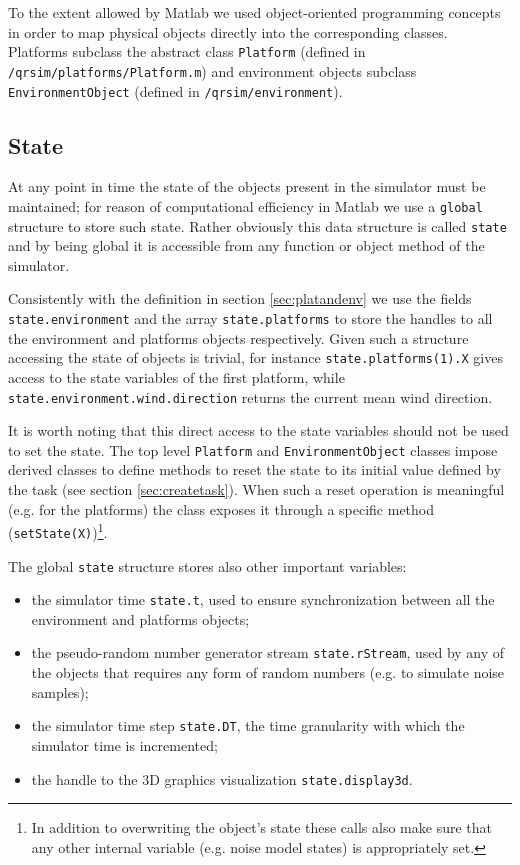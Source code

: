 \documentclass[a4paper,11pt]{report}
\begin{document}
To the extent allowed by Matlab we used object-oriented programming concepts in order to map physical objects directly into the corresponding classes. Platforms subclass the abstract class \texttt{Platform} (defined in \texttt{/qrsim/platforms/Platform.m}) and environment objects subclass \texttt{EnvironmentObject} (defined in \texttt{/qrsim/environment}).

\subsection{State}\label{sec:state}

At any point in time the state of the objects present in the simulator must be maintained; for reason of computational efficiency in Matlab we use a \texttt{global} structure to store such state. Rather obviously this data structure is called \texttt{state} and by being global it is accessible from any function or object method of the simulator.

Consistently with the definition in section \ref{sec:platandenv} we use the fields \texttt{state.environment} and the array \texttt{state.platforms} to store the handles to all the environment and platforms objects respectively. 
Given such a structure accessing the state of objects is trivial, for instance \texttt{state.platforms(1).X} gives access to the state variables of the first platform, while \texttt{state.environment.wind.direction} returns the current mean wind direction. 

It is worth noting that this direct access to the state variables should not be used to set the state.
The top level \texttt{Platform} and \texttt{EnvironmentObject} classes impose derived classes to define methods to reset the state to its initial value defined by the task (see section \ref{sec:createtask}).
When such a reset operation is meaningful (e.g. for the platforms) the class exposes it through a specific method (\texttt{setState(X)})\footnote{In addition to overwriting the object's state these calls also make sure that any other internal variable (e.g. noise model states) is appropriately set.}.

The global \texttt{state} structure stores also other important variables:
\begin{itemize}
 \item the simulator time \texttt{state.t}, used to ensure synchronization between all the environment and platforms objects;
 \item the pseudo-random number generator stream \texttt{state.rStream}, used by any of the objects that requires any form of random numbers (e.g. to simulate noise samples);
 \item the simulator time step \texttt{state.DT}, the time granularity with which the simulator time is incremented;
 \item the handle to the 3D graphics visualization \texttt{state.display3d}.
\end{itemize}
\end{document}
